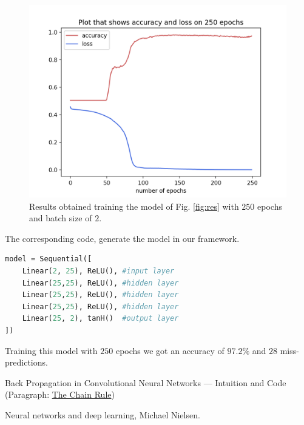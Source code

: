 \documentclass[journal, a4paper]{IEEEtran}
\begin{document}
\begin{figure}[!h]
    \centering
    \includegraphics[width=0.99\linewidth]{accuracy_loss.png}
    \caption{Results obtained training the model of Fig. \ref{fig:res} with $250$ epochs and batch size of $2$.}
    \label{fig:plot}
\end{figure}
The corresponding code, generate the model in our framework.
\begin{lstlisting}[language=Python]
model = Sequential([
    Linear(2, 25), ReLU(), #input layer
    Linear(25,25), ReLU(), #hidden layer
    Linear(25,25), ReLU(), #hidden layer
    Linear(25,25), ReLU(), #hidden layer
    Linear(25, 2), tanH()  #output layer
])
\end{lstlisting}
Training this model with $250$ epochs we got an accuracy of $97.2\%$ and $28$ miss-predictions.

\begin{thebibliography}{999}

    	Back Propagation in Convolutional Neural Networks — Intuition and Code (Paragraph: 
    	\href{https://becominghuman.ai/back-propagation-in-convolutional-neural-networks-intuition-and-code-714ef1c38199}{The Chain Rule})
	
	    Neural networks and deep learning, Michael Nielsen.

\end{thebibliography}

\end{document}
